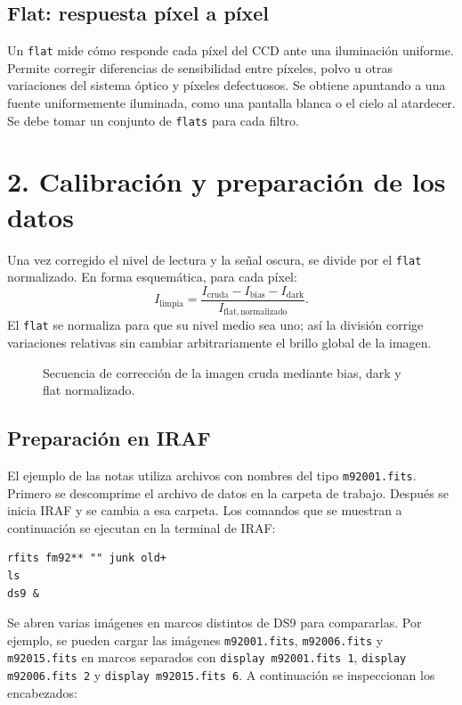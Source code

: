 \documentclass[11pt,twocolumn]{article}
\newcommand{\widefigure}[2]{\begin{figure}[!t]\centering\caption{#2}\end{figure}}
\begin{document}
\subsection*{Flat: respuesta píxel a píxel}
Un \texttt{flat} mide cómo responde cada píxel del CCD ante una iluminación
uniforme. Permite corregir diferencias de sensibilidad entre píxeles, polvo u
otras variaciones del sistema óptico y píxeles defectuosos. Se obtiene
apuntando a una fuente uniformemente iluminada, como una pantalla blanca o el
cielo al atardecer. Se debe tomar un conjunto de \texttt{flats} para cada filtro.

\section*{2. Calibración y preparación de los datos}

Una vez corregido el nivel de lectura y la señal oscura, se divide por el
\texttt{flat} normalizado. En forma esquemática, para cada píxel:
\[
  I_{\mathrm{limpia}} =
  \frac{I_{\mathrm{cruda}}-I_{\mathrm{bias}}-I_{\mathrm{dark}}}
       {I_{\mathrm{flat, normalizado}}}.
\]
El \texttt{flat} se normaliza para que su nivel medio sea uno; así la división
corrige variaciones relativas sin cambiar arbitrariamente el brillo global de
la imagen.

\widefigure{figuras/proceso_calibracion.tex}{Secuencia de corrección de la imagen cruda mediante bias, dark y flat normalizado.}

\subsection*{Preparación en IRAF}
El ejemplo de las notas utiliza archivos con nombres del tipo
\texttt{m92001.fits}. Primero se descomprime el archivo de datos en la carpeta
de trabajo. Después se inicia IRAF y se cambia a esa carpeta. Los comandos que
se muestran a continuación se ejecutan en la terminal de IRAF:

\begin{verbatim}
rfits fm92** "" junk old+
ls
ds9 &
\end{verbatim}

Se abren varias imágenes en marcos distintos de DS9 para compararlas. Por
ejemplo, se pueden cargar las imágenes \texttt{m92001.fits},
\texttt{m92006.fits} y \texttt{m92015.fits} en marcos separados con
\texttt{display m92001.fits 1}, \texttt{display m92006.fits 2} y
\texttt{display m92015.fits 6}. A continuación se inspeccionan los encabezados:
\end{document}
